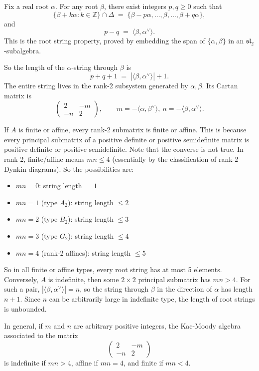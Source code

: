 \documentclass[12pt]{article}
\begin{document}
\begin{solution}
    Fix a real root $\alpha$. For any root $\beta$, there exist integers $p,q\geq 0$ such that
    \[
        \{\beta+k\alpha : k\in\mathbb Z\}\cap \Delta \;=\; \{\beta-p\alpha, \dots, \beta, \dots, \beta+q\alpha\},
    \]
    and
    \[
        p-q \;=\;\langle \beta, \alpha^\vee\rangle.
    \]
    This is the root string property, proved by embedding the span of $\{\alpha,\beta\}$ in an $\mathfrak{sl}_2$-subalgebra.

    So the length of the $\alpha$-string through $\beta$ is
    \[
        p+q+1 \;=\; |\langle \beta, \alpha^\vee\rangle|+1.
    \]
    The entire string lives in the rank-2 subsystem generated by $\alpha,\beta$. Its Cartan matrix is
    \[
        \begin{pmatrix}
            2 & -m \\ -n & 2
        \end{pmatrix},\qquad
        m=-\langle \alpha,\beta^\vee\rangle,\ n=-\langle \beta,\alpha^\vee\rangle.
    \]

    If $A$ is finite or affine, every rank-2 submatrix is finite or affine. This is because every principal submatrix of a positive definite or positive semidefinite matrix is positive definite or positive semidefinite. Note that the converse is not true. In rank 2, finite/affine means $mn \leq 4$ (essentially by the classification of rank-2 Dynkin diagrams). So the possibilities are:
    \begin{itemize}
        \item $mn=0$: string length $=1$
        \item $mn=1$ (type $A_2$): string length $\leq 2$
        \item $mn=2$ (type $B_2$): string length $\leq 3$
        \item $mn=3$ (type $G_2$): string length $\leq 4$
        \item $mn=4$ (rank-2 affines): string length $\leq 5$
    \end{itemize}
    So in all finite or affine types, every root string has at most 5 elements. Conversely, $A$ is indefinite, then some $2\times2$ principal submatrix has $mn>4$. For such a pair, $|\langle\beta,\alpha^\vee\rangle|=n$, so the string through $\beta$ in the direction of $\alpha$ has length $n+1$. Since $n$ can be arbitrarily large in indefinite type, the length of root strings is unbounded.
\end{solution}

\begin{remark}
    In general, if $m$ and $n$ are arbitrary positive integers, the Kac-Moody algebra associated to the matrix
    \[\begin{pmatrix}
            2 & -m \\ -n & 2
        \end{pmatrix}\]
    is indefinite if $mn>4$, affine if $mn=4$, and finite if $mn<4$.
\end{remark}
\end{document}
